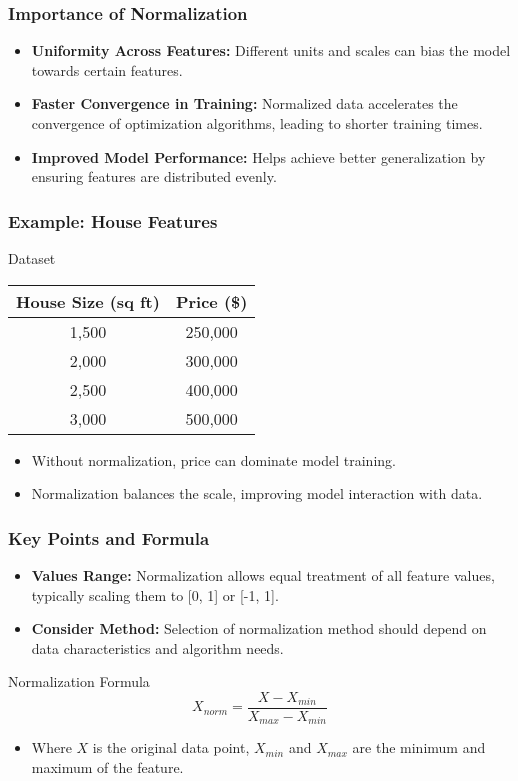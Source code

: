 \documentclass[aspectratio=169]{beamer}
\begin{document}
\begin{frame}[fragile]
    \frametitle{Importance of Normalization}
    \begin{itemize}
        \item \textbf{Uniformity Across Features:} Different units and scales can bias the model towards certain features.
        \item \textbf{Faster Convergence in Training:} Normalized data accelerates the convergence of optimization algorithms, leading to shorter training times.
        \item \textbf{Improved Model Performance:} Helps achieve better generalization by ensuring features are distributed evenly.
    \end{itemize}
\end{frame}

\begin{frame}[fragile]
    \frametitle{Example: House Features}
    \begin{block}{Dataset}
        \begin{tabular}{|c|c|}
            \hline
            House Size (sq ft) & Price (\$) \\
            \hline
            1,500 & 250,000 \\
            2,000 & 300,000 \\
            2,500 & 400,000 \\
            3,000 & 500,000 \\
            \hline
        \end{tabular}
    \end{block}
    \begin{itemize}
        \item Without normalization, price can dominate model training.
        \item Normalization balances the scale, improving model interaction with data.
    \end{itemize}
\end{frame}

\begin{frame}[fragile]
    \frametitle{Key Points and Formula}
    \begin{itemize}
        \item \textbf{Values Range:} Normalization allows equal treatment of all feature values, typically scaling them to [0, 1] or [-1, 1].
        \item \textbf{Consider Method:} Selection of normalization method should depend on data characteristics and algorithm needs.
    \end{itemize}
    \begin{block}{Normalization Formula}
        \begin{equation}
            X_{norm} = \frac{X - X_{min}}{X_{max} - X_{min}} 
        \end{equation}
    \end{block}
    \begin{itemize}
        \item Where \(X\) is the original data point, \(X_{min}\) and \(X_{max}\) are the minimum and maximum of the feature.
    \end{itemize}
\end{frame}
\end{document}
